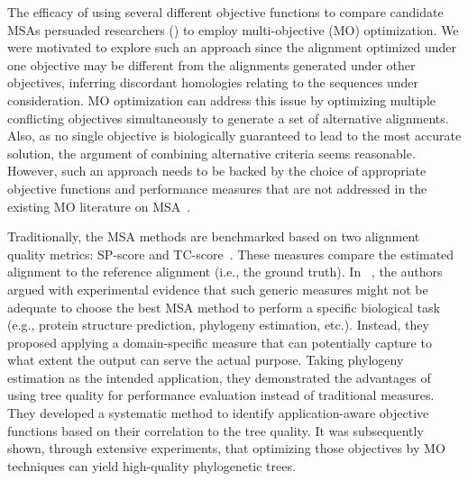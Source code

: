 \documentclass[a4paper,fleqn, review]{cas-dc}
\begin{document}
The efficacy of using several different objective functions to compare candidate MSAs persuaded researchers (\cite{da2010alineaga, ortuno2013optimizing, soto2014multi, abbasi2015local, rubio2016hybrid,zambrano2017comparing, rubio2018characteristic, benitez2020sequoya}) to employ multi-objective (MO) optimization. We were motivated to explore such an approach since the alignment optimized under one objective may be different from the alignments generated under other objectives, inferring discordant homologies relating to the sequences under consideration. MO optimization can address this issue by
optimizing multiple conflicting objectives simultaneously to
generate a set of alternative alignments. Also, as no single objective is biologically guaranteed to lead to the most accurate solution, the argument of combining alternative criteria seems reasonable. However, such an approach needs to be backed by the choice of appropriate objective functions and performance measures that are not addressed in the existing MO literature on MSA~\cite{nayeem2020multiobjective}.  


Traditionally, the MSA methods are benchmarked based on two alignment quality metrics: SP-score and TC-score~\cite{warnow2017computational}. These measures compare the estimated alignment to the reference alignment (i.e., the ground truth). In ~\cite{nayeem2020multiobjective, nayeem2019phylogeny}, the authors argued with experimental evidence that such generic measures might not be adequate to choose the best MSA method to perform a specific biological task (e.g., protein structure prediction, phylogeny estimation, etc.). Instead, they proposed applying a domain-specific measure that can potentially capture to what extent the output can serve the actual purpose. Taking phylogeny estimation as the intended application, they demonstrated the advantages of using tree quality for performance evaluation instead of traditional measures. They developed a systematic method to identify application-aware objective functions based on their correlation to the tree quality. It was subsequently shown, through extensive experiments, that optimizing those objectives by MO techniques can yield high-quality phylogenetic trees.
\end{document}
